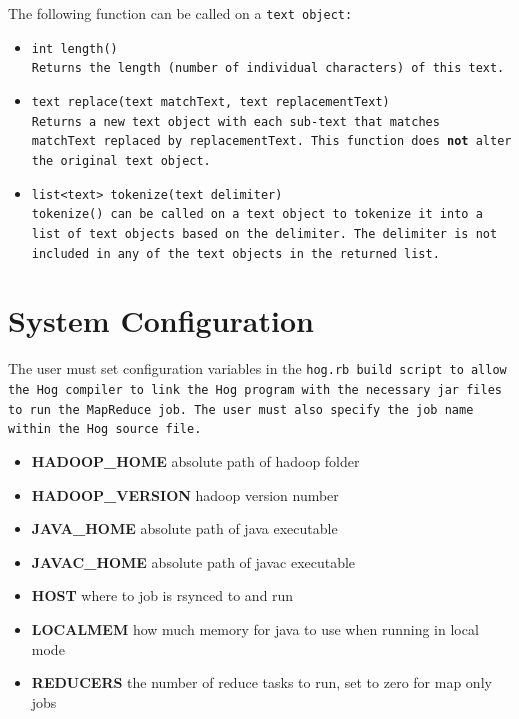 \documentclass{book}
\begin{document}
The following function can be called on a \tt text \rm object:

\begin{itemize}

\item[] \tt int length() \rm \\

Returns the length (number of individual characters) of this \tt text\rm.

\item[] \tt text replace(text matchText, text replacementText) \rm \\

Returns a new \tt text \rm object with each sub-\tt text \rm that matches \tt
matchText \rm replaced by \tt replacementText\rm. This function does \textbf{not}
alter the original \tt text \rm object.

\item[] \tt list<text> tokenize(text delimiter) \rm \\

\tt tokenize() \rm can be called on a \tt text \rm object to tokenize it into a
list of \tt text \rm objects based on the delimiter. The delimiter is not included
in any of the \tt text \rm objects in the returned list.

\end{itemize}




\section{System Configuration} %
\label{sec:system_configuration}

The user must set configuration variables in the \tt hog.rb \rm build script to
allow the Hog compiler to link the Hog program with the necessary jar files to run
the MapReduce job. The user must also specify the job name within the Hog source
file.

\begin{itemize}

\item[] \textbf{HADOOP\_HOME} absolute path of hadoop folder
\item[] \textbf{HADOOP\_VERSION} hadoop version number
\item[] \textbf{JAVA\_HOME} absolute path of java executable
\item[] \textbf{JAVAC\_HOME} absolute path of javac executable
\item[] \textbf{HOST} where to job is rsynced to and run
\item[] \textbf{LOCALMEM} how much memory for java to use when running in local mode 
\item[] \textbf{REDUCERS} the number of reduce tasks to run, set to zero for map only jobs

\end{itemize}
\end{document}
